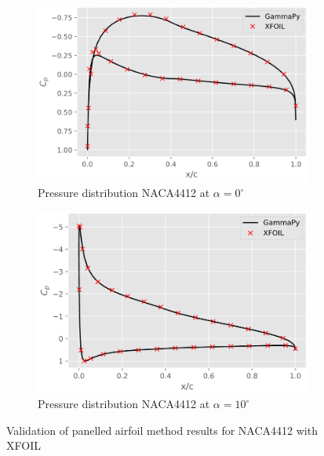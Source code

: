 \begin{figure}[h]
    \centering
    \begin{subfigure}{.5\textwidth}
      \centering
      \includegraphics[width=.9\linewidth]{static/naca4412_0_verif_thick.png}
      \caption{Pressure distribution NACA4412 at $\alpha = 0^{\circ}$}
      \label{fig:thick_verif1}
    \end{subfigure}%
    \begin{subfigure}{.5\textwidth}
      \centering
      \includegraphics[width=.9\linewidth]{static/naca4412_verif_thick.png}
      \caption{Pressure distribution NACA4412 at $\alpha = 10^{\circ}$}
      \label{fig:thick_verif2}
    \end{subfigure}
    \caption{\centering Validation of panelled airfoil method results for NACA4412 with XFOIL\cite{xfoil}}
    \label{fig:thick_verif}
\end{figure}

